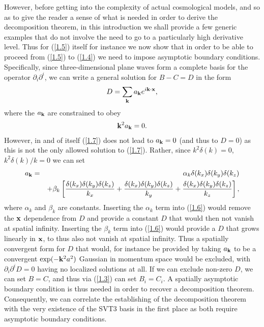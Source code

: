 However, before getting into the complexity of actual cosmological models, and so as to give the reader a sense of what is needed in order to derive the decomposition theorem, in this introduction we shall provide a few generic examples that do not involve the need to go to a particularly high derivative level. Thus for (\ref{1.5}) itself for instance we now show that in order to be able to proceed from (\ref{1.5}) to (\ref{1.4}) we need to impose asymptotic boundary conditions. Specifically, since three-dimensional plane waves form a complete basis for the operator $\partial_i\partial^i$, we can write a general solution for $B-C=D$ in the form
%
\begin{eqnarray}
D=\sum _{\bf k}a_{\bf k}e^{i\textbf{k}\cdot \textbf{x}},
\label{1.6}
\end{eqnarray}
%
where the $a_{\bf k}$ are constrained to obey 
%
\begin{eqnarray}
{\bf k}^2a_{\bf k}=0.
\label{1.7}
\end{eqnarray}
%
However, in and of itself (\ref{1.7}) does not lead to $a_{\bf k}=0$ (and thus to $D=0$) as this is not the only allowed solution to (\ref{1.7}). Rather, since $k^2\delta(k)=0$, $k^2\delta(k)/k=0$ we can set
%
\begin{eqnarray}
a_{\bf k}&=&\alpha_k\delta(k_x)\delta(k_y)\delta(k_z)
\nonumber\\
&&+\beta_k\left[\frac{\delta (k_x)\delta (k_y)\delta (k_z)}{k_x}+\frac{\delta (k_x)\delta (k_y)\delta (k_z)}{k_y}+\frac{\delta (k_x)\delta (k_y)\delta (k_z)}{k_z}\right],
\label{1.8}
\end{eqnarray}
%
where $\alpha_k$ and $\beta_k$ are constants. Inserting the $\alpha_k$ term  into (\ref{1.6}) would remove the ${\bf x}$ dependence from $D$ and provide a constant $D$ that would then not vanish at spatial infinity. Inserting the $\beta_k$ term  into (\ref{1.6}) would provide a $D$ that grows linearly in ${\bf x}$, to thus also not vanish at spatial infinity. Thus a spatially convergent  form for $D$ that would, for instance  be provided by taking  $a_{\bf k}$ to be a convergent $\exp(-{\bf k}^2a^2)$ Gaussian in momentum space would be excluded, with  $\partial_i\partial^iD=0$ having no localized solutions at all. If we can exclude non-zero $D$, we can set $B=C$, and thus via (\ref{1.3})  can set $B_i=C_i$.  A spatially asymptotic boundary condition is thus needed in order to recover a decomposition theorem. Consequently, we can correlate the establishing of the decomposition theorem with the very existence of the SVT3 basis in the first place as both require asymptotic boundary conditions.


